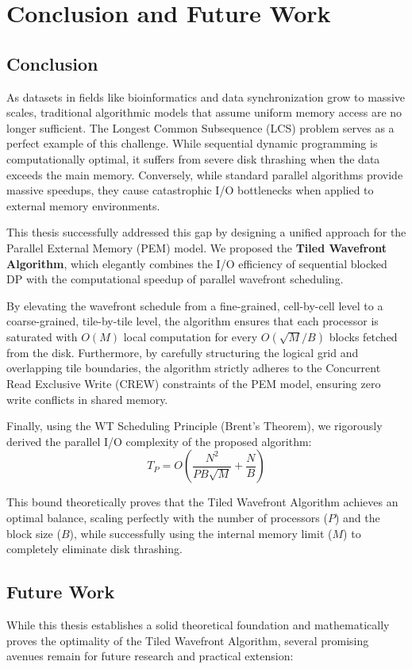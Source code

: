 
\chapter{Conclusion and Future Work}

\section{Conclusion}
As datasets in fields like bioinformatics and data synchronization grow to massive scales, traditional algorithmic models that assume uniform memory access are no longer sufficient. The Longest Common Subsequence (LCS) problem serves as a perfect example of this challenge. While sequential dynamic programming is computationally optimal, it suffers from severe disk thrashing when the data exceeds the main memory. Conversely, while standard parallel algorithms provide massive speedups, they cause catastrophic I/O bottlenecks when applied to external memory environments.

This thesis successfully addressed this gap by designing a unified approach for the Parallel External Memory (PEM) model. We proposed the \textbf{Tiled Wavefront Algorithm}, which elegantly combines the I/O efficiency of sequential blocked DP with the computational speedup of parallel wavefront scheduling.

By elevating the wavefront schedule from a fine-grained, cell-by-cell level to a coarse-grained, tile-by-tile level, the algorithm ensures that each processor is saturated with $O(M)$ local computation for every $O(\sqrt{M}/B)$ blocks fetched from the disk. Furthermore, by carefully structuring the logical grid and overlapping tile boundaries, the algorithm strictly adheres to the Concurrent Read Exclusive Write (CREW) constraints of the PEM model, ensuring zero write conflicts in shared memory.

Finally, using the WT Scheduling Principle (Brent's Theorem), we rigorously derived the parallel I/O complexity of the proposed algorithm:
$$ T_P = O\left( \frac{N^2}{P B \sqrt{M}} + \frac{N}{B} \right) $$

This bound theoretically proves that the Tiled Wavefront Algorithm achieves an optimal balance, scaling perfectly with the number of processors ($P$) and the block size ($B$), while successfully using the internal memory limit ($M$) to completely eliminate disk thrashing.

\section{Future Work}
While this thesis establishes a solid theoretical foundation and mathematically proves the optimality of the Tiled Wavefront Algorithm, several promising avenues remain for future research and practical extension:

